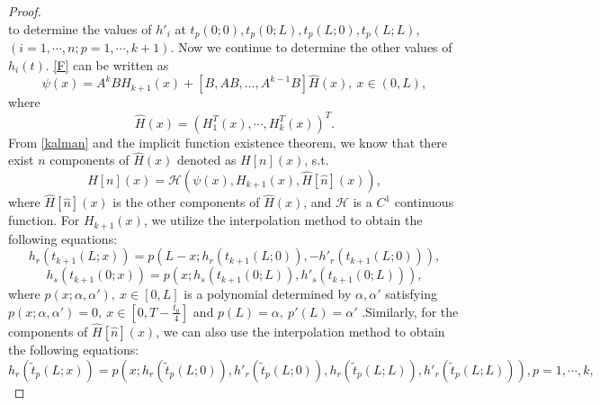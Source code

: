 \documentclass[a4paper,reqno,11pt]{amsart}
\numberwithin{equation}{section} %
\begin{document}
\begin{proof}
\begin{equation}
\end{equation}
to determine the values of $h'_i$ at $t_p(0;0),t_p(0;L),t_p(L;0),t_p(L;L)$,$(i=1,\cdots,n; p=1,\cdots,k+1)$.
Now we continue to determine the other values of $h_i(t)$. \eqref{F} can be written as
\begin{equation}\label{G}
    \psi\left( x \right) =A^kBH_{k+1}\left( x \right) +\left[B, AB, \ldots, A^{k-1} B\right] \hat{H}(x)  ,\ x\in \left( 0,L \right),
\end{equation}
where 
$$
\hat{H}(x)=\left( H^T_1\left( x \right) ,\cdots ,H^T_k\left( x \right) \right)^T .
$$
From \eqref{kalman} and the implicit function existence theorem, we know that there exist $n$ components of $\hat{H}(x)$ denoted as $H[n](x) $, s.t.
\begin{equation}\label{H}
H\left[ n \right] \left( x \right) =\mathcal{H} \left( \psi\left( x \right) ,H_{k+1}\left( x \right) ,\hat{H}\left[ \hat{n} \right] \left( x \right) \right) ,
\end{equation}
where $\hat{H}\left[ \hat{n} \right] \left( x \right)$ is the other components of $\hat{H}(x)$, and $\mathcal{H}$ is a $C^1$ continuous function. For $H_{k+1}\left( x \right) $, we utilize the interpolation method to obtain the following equations:
\begin{equation}\label{polynomial k+1 r}
h_r\left( t_{k+1}\left( L;x \right) \right) =p\left( L-x;h_r\left( t_{k+1}\left( L;0 \right) \right) ,-h'_r\left( t_{k+1}\left( L;0 \right) \right) \right) ,
\end{equation}
\begin{equation}\label{polynomial k+1 s}
	h_s\left( t_{k+1}\left( 0;x \right) \right) =p\left( x;h_s\left( t_{k+1}\left( 0;L \right) \right) ,h'_s\left( t_{k+1}\left( 0;L \right) \right) \right) ,
\end{equation}
where $p(x;\alpha ,\alpha  ') ,\ x \in [0,L]$ is a polynomial determined by $\alpha ,\alpha  '$ satisfying $p(x;\alpha ,\alpha  ') =0, \  x \in [0,T-\frac{t_0}{4}]$ and $p(L)=\alpha ,\ p'(L)=\alpha  '$ .Similarly, for the components of $\hat{H}\left[ \hat{n} \right] \left( x \right)$, we can also use the interpolation method to obtain the following equations:
\begin{equation}\label{polynomial p r}
	h_r\left( \tilde{t}_p\left( L;x \right) \right) =p\left( x;h_r\left( \tilde{t}_p\left( L;0 \right) \right) ,h'_r\left( \tilde{t}_p\left( L;0 \right) \right) ,h_r\left( \tilde{t}_p\left( L;L \right) \right) ,h'_r\left( \tilde{t}_p\left( L;L \right) \right) \right) ,p=1,\cdots,k,
\end{equation}

\end{proof}
\end{document}
